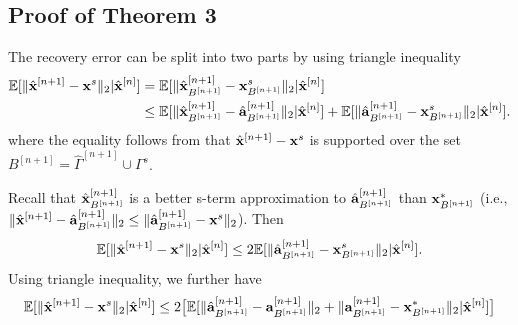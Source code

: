 \documentclass{article}
\begin{document}



\subsection{Proof of Theorem 3}
The recovery error can be split into two parts by using triangle inequality
\begin{equation}\label{main_theorem}
\begin{split}
   \mathbb{E}[ \|\hat{{\bf x}}^{[n+1]} - {\bf x}^s \|_2 | \hat{{\bf x}}^{[n]}] &= \mathbb{E}[\|\hat{{\bf x}}_{B^{[n+1]}}^{[n+1]} - {\bf x}_{B^{[n+1]}}^s \|_2| \hat{{\bf x}}^{[n]}] \\
    &\leq \mathbb{E}[\|\hat{{\bf x}}_{B^{[n+1]}}^{[n+1]} - \hat{{\bf a}}_{B^{[n+1]}}^{[n+1]} \|_2| \hat{{\bf x}}^{[n]}] + \mathbb{E}[\|\hat{{\bf a}}_{B^{[n+1]}}^{[n+1]} - {\bf x}_{B^{[n+1]}}^s \|_2| \hat{{\bf x}}^{[n]}].
    \end{split}
\end{equation}
where the equality follows from that $\hat{{\bf x}}^{[n+1]} - {\bf x}^s$ is supported over the set $B^{[n+1]} = \hat{\Gamma}^{[n+1]} \cup \Gamma^s$.

Recall that $\hat{{\bf x}}_{B^{[n+1]}}^{[n+1]}$ is a better s-term approximation to $\hat{{\bf a}}_{B^{[n+1]}}^{[n+1]}$ than ${\bf x}_{B^{[n+1]}}^{*}$ (i.e., $\|\hat{{\bf x}}^{[n+1]} - \hat{{\bf a}}_{B^{[n+1]}}^{[n+1]} \|_2\leq \| \hat{{\bf a}}_{B^{[n+1]}}^{[n+1]} - {\bf x}^s \|_2$). Then 
\begin{equation}
    \mathbb{E}[\|\hat{{\bf x}}^{[n+1]} - {\bf x}^s \|_2| \hat{{\bf x}}^{[n]}] \leq 2\mathbb{E}[ \|\hat{{\bf a}}_{B^{[n+1]}}^{[n+1]} - {\bf x}_{B^{[n+1]}}^s \|_2 | \hat{{\bf x}}^{[n]}].
\end{equation}
Using triangle inequality, we further have
\begin{equation}\label{nonproof_bound_final}
    \mathbb{E}[\|\hat{{\bf x}}^{[n+1]} - {\bf x}^s \|_2| \hat{{\bf x}}^{[n]}]\leq 2 \big [\mathbb{E}[\|\hat{{\bf a}}_{B^{[n+1]}}^{[n+1]} - {{\bf a}}_{B^{[n+1]}}^{[n+1]} \|_2  + \|{{\bf a}}_{B^{[n+1]}}^{[n+1]} - {{\bf x}}_{B^{[n+1]}}^{*} \|_2 | \hat{{\bf x}}^{[n]}]\big ]
\end{equation}
\end{document}
